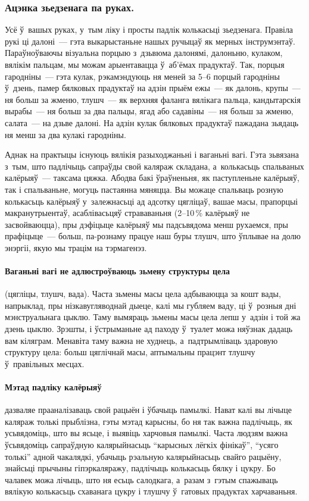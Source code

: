 \subsubsection{Ацэнка зьедзенага па руках.}
Усё ў~вашых руках, у~тым ліку і просты падлік колькасьці зьедзенага. Правіла рукі ці далоні~--- гэта выкарыстаньне нашых ручыцаў як мерных інструмэнтаў. Параўноўваючы візуальна порцыю з~дзьвюма далонямі, далоньню, кулаком, вялікім пальцам, мы можам арыентавацца ў~аб'ёмах прадуктаў. Так, порцыя гародніны~--- гэта кулак, рэкамэндуюць ня меней за 5--6 порцый гародніны ў~дзень, памер бялковых прадуктаў на адзін прыём ежы~--- як далонь, крупы~--- ня больш за жменю, тлушч~--- як верхняя фаланга вялікага пальца, кандытарскія вырабы~--- ня больш за два пальцы, ягад або садавіны~--- ня больш за жменю, салата~--- на дзьве далоні. На адзін кулак бялковых прадуктаў пажадана зьядаць ня менш за два кулакі гародніны.

Аднак на практыцы існуюць вялікія разыходжаньні і ваганьні вагі. Гэта зьвязана з~тым, што падлічыць сапраўды свой каляраж складана, а~колькасьць спальваных калёрыяў~--- таксама цяжка. Абодва бакі ўраўненьня, як паступленьне калёрыяў, так і спальваньне, могуць пастаянна мяняцца. Вы можаце спальваць розную колькасьць калёрыяў у~залежнасьці ад адсотку цягліцаў, вашае масы, прапорцыі макранутрыентаў, асаблівасьцяў страваваньня (2--10\,\% калёрыяў не засвойваюцца), пры дэфіцыце калёрыяў мы падсьвядома менш рухаемся, пры прафіцыце~--- больш, па-рознаму працуе наш буры тлушч, што ўплывае на долю энэргіі, якую мы трацім на тэрмагенэз.

\paragraph{Ваганьні вагі не адлюстроўваюць зьмену структуры цела} (цягліцы, тлушч, вада). Часта зьмены масы цела адбываюцца за кошт вады, напрыклад, пры нізкавугляводнай дыеце, калі мы губляем ваду, ці ў~розныя дні мэнструальнага цыклю. Таму вымяраць зьмены масы цела лепш у~адзін і той жа дзень цыклю. Зрэшты, і ўстрыманьне ад паходу ў~туалет можа няўзнак дадаць вам кіляграм. Менавіта таму важна не худнець, а~падтрымліваць здаровую структуру цела: больш цяглічнай масы, аптымальны працэнт тлушчу ў~правільных месцах.

\paragraph{Мэтад падліку калёрыяў} дазваляе прааналізаваць свой рацыён і ўбачыць памылкі. Нават калі вы лічыце каляраж толькі прыблізна, гэты мэтад карысны, бо ня так важна падлічыць, як усьвядоміць, што вы ясьце, і выявіць харчовыя памылкі. Часта людзям важна ўсьвядоміць сапраўдную калярыйнасьць ``карысных лёгкіх фінікаў'', ``усяго толькі'' адной чакалядкі, убачыць рэальную калярыйнасьць свайго рацыёну, знайсьці прычыны гіпэркаляражу, падлічыць колькасьць бялку і цукру. Бо чалавек можа лічыць, што ня есьць салодкага, а~разам з~гэтым спажываць вялікую колькасьць схаванага цукру і тлушчу ў~гатовых прадуктах харчаваньня.

